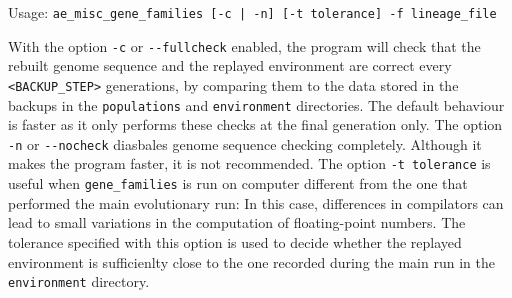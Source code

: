 Usage: \verb?ae_misc_gene_families [-c | -n] [-t tolerance] -f lineage_file?

With the option \verb?-c? or \verb?--fullcheck? enabled, the program will check that the rebuilt genome sequence and the replayed environment are correct every \verb?<BACKUP_STEP>? generations, by comparing them to the data stored in the backups in the \verb?populations? and \verb?environment? directories. The default behaviour is faster as it only performs these checks at the final generation only. The option \verb?-n? or \verb?--nocheck? diasbales genome sequence checking completely. Although it makes the program faster, it is not recommended. The option \verb?-t tolerance? is useful when \verb?gene_families? is run on computer different from the one that performed the main evolutionary run: In this case, differences in compilators can lead to small variations in the computation of floating-point numbers. The tolerance specified with this option is used to decide whether the replayed environment is sufficienlty close to the one recorded during the main run in the \verb?environment? directory.



\clearemptydoublepage






